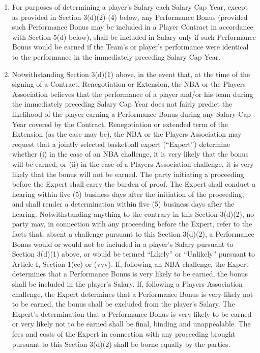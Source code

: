 \documentclass[
]{book}
\providecommand{\tightlist}{%
  \setlength{\itemsep}{0pt}\setlength{\parskip}{0pt}}
\begin{document}
\begin{enumerate}
  \begin{enumerate}
  \def\labelenumii{(\arabic{enumii})}
  \tightlist
  \item
    For purposes of determining a player's Salary each Salary Cap Year, except as provided in Section 3(d)(2)-(4) below, any Performance Bonus (provided such Performance Bonus may be included in a Player Contract in accordance with Section 5(d) below), shall be included in Salary only if such Performance Bonus would be earned if the Team's or player's performance were identical to the performance in the immediately preceding Salary Cap Year.
  \item
    Notwithstanding Section 3(d)(1) above, in the event that, at the time of the signing of a Contract, Renegotiation or Extension, the NBA or the Players Association believes that the performance of a player and/or his team during the immediately preceding Salary Cap Year does not fairly predict the likelihood of the player earning a Performance Bonus during any Salary Cap Year covered by the Contract, Renegotiation or extended term of the Extension (as the case may be), the NBA or the Players Association may request that a jointly selected basketball expert (``Expert'') determine whether (i) in the case of an NBA challenge, it is very likely that the bonus will be earned, or (ii) in the case of a Players Association challenge, it is very likely that the bonus will not be earned. The party initiating a proceeding before the Expert shall carry the burden of proof. The Expert shall conduct a hearing within five (5) business days after the initiation of the proceeding, and shall render a determination within five (5) business days after the hearing. Notwithstanding anything to the contrary in this Section 3(d)(2), no party may, in connection with any proceeding before the Expert, refer to the facts that, absent a challenge pursuant to this Section 3(d)(2), a Performance Bonus would or would not be included in a player's Salary pursuant to Section 3(d)(1) above, or would be termed ``Likely'' or ``Unlikely'' pursuant to Article I, Section 1(cc) or (vvv). If, following an NBA challenge, the Expert determines that a Performance Bonus is very likely to be earned, the bonus shall be included in the player's Salary. If, following a Players Association challenge, the Expert determines that a Performance Bonus is very likely not to be earned, the bonus shall be excluded from the player's Salary. The Expert's determination that a Performance Bonus is very likely to be earned or very likely not to be earned shall be final, binding and unappealable. The fees and costs of the Expert in connection with any proceeding brought pursuant to this Section 3(d)(2) shall be borne equally by the parties.

\end{enumerate}
\end{enumerate}
\end{document}
